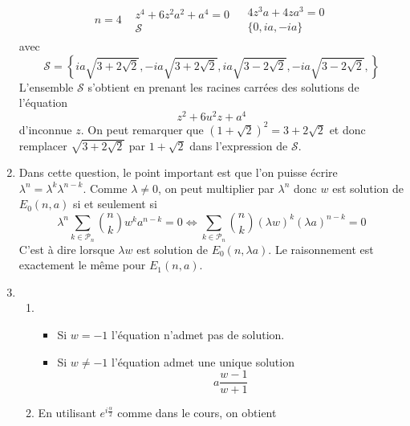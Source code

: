 \begin{enumerate}
\begin{displaymath}
\begin{array}{c|c|c}
  \\ 
\hline n=4 &
\begin{array}{c}
 z^4+6z^2a^2+a^4=0 \\ \mathcal S
\end{array}
 & 
\begin{array}{c}
4z^3a+4za^3=0 \\ \{ 0,ia, -ia\}
\end{array}
\end{array}
\end{displaymath}
avec
\begin{displaymath}
 \mathcal S = \left\lbrace ia\sqrt{3+2\sqrt{2}}, -ia\sqrt{3+2\sqrt{2}}, ia\sqrt{3-2\sqrt{2}}, -ia\sqrt{3-2\sqrt{2}},  \right\rbrace 
\end{displaymath}
L'ensemble $\mathcal S $ s'obtient en prenant les racines carrées des solutions de l'équation 
\begin{displaymath}
z^2+6u^2z+a^4 
\end{displaymath}
d'inconnue $z$.
On peut remarquer que $(1+\sqrt 2)^2 = 3+2\sqrt{2}$ et donc remplacer $\sqrt{3+2\sqrt{2}}$ par $1+\sqrt 2$ dans l'expression de $\mathcal S$.
\item Dans cette question, le point important est que l'on puisse écrire $\lambda^n=\lambda^k \lambda^{n-k}$. Comme $\lambda\neq 0$, on peut multiplier par $\lambda^n$ donc $w$ est solution de $E_0(n,a)$ si et seulement si
\begin{displaymath}
 \lambda^n \sum_{k\in \mathcal P _n}\binom{n}{k}w^ka^{n-k}=0
\Leftrightarrow
\sum_{k\in \mathcal P _n}\binom{n}{k}(\lambda w)^k(\lambda a)^{n-k}=0
\end{displaymath}
C'est à dire lorsque $\lambda w$ est solution de $E_0(n,\lambda a)$. Le raisonnement est exactement le même pour $E_1(n,a)$.
\item 
\begin{enumerate}
 \item 
   \begin{itemize}
     \item Si $w=-1$ l'équation n'admet pas de solution.
     \item Si $w\neq -1$ l'équation admet une unique solution
\begin{displaymath}
 a\frac{w-1}{w+1}
\end{displaymath}
   \end{itemize}
\item En utilisant $e^{i\frac{\alpha}{2}}$ comme dans le cours, on obtient
\begin{displaymath}

\end{displaymath}
\end{enumerate}
\end{enumerate}
